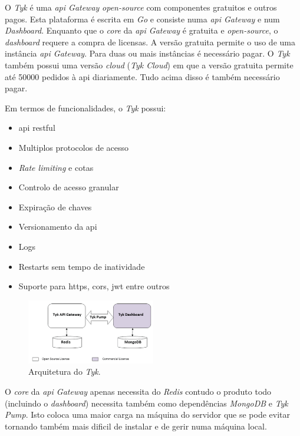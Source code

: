 O \textit{Tyk} é uma \textit{\acrshort{api} Gateway} \textit{open-source} com componentes gratuitos e outros pagos. Esta plataforma é escrita em \textit{Go} e consiste numa \textit{\acrshort{api} Gateway} e num \textit{Dashboard}. Enquanto que o \textit{core} da \textit{\acrshort{api} Gateway} é gratuita e \textit{open-source}, o \textit{dashboard} requere a compra de licensas. A versão gratuita permite o uso de uma instância \textit{\acrshort{api} Gateway}. Para duas ou mais instâncias é necessário pagar. O \textit{Tyk} também possui uma versão \textit{cloud} (\textit{Tyk Cloud}) em que a versão gratuita permite até 50000 pedidos à \acrshort{api} diariamente. Tudo acima disso é também necessário pagar.

Em termos de funcionalidades, o \textit{Tyk} possui:~\cite{tyk}
\begin{itemize}
    \item \acrshort{api} \acrshort{rest}ful
    \item Multiplos protocolos de acesso
    \item \textit{Rate limiting} e cotas
    \item Controlo de acesso granular
    \item Expiração de chaves
    \item Versionamento da \acrshort{api}
    \item Logs
    \item Restarts sem tempo de inatividade
    \item Suporte para \acrshort{https}, \acrshort{cors}, \acrshort{jwt} entre outros
\end{itemize}

\begin{figure}[H]
    \begin{center}
        \includegraphics[width=0.5\textwidth]{img/tykArch.png}
    \end{center}
    \caption{Arquitetura do \textit{Tyk}.~\cite{tyk}}
\end{figure}

O \textit{core} da \textit{\acrshort{api} Gateway} apenas necessita do \textit{Redis} contudo o produto todo (incluindo o \textit{dashboard}) necessita também como dependências \textit{MongoDB} e \textit{Tyk Pump}. Isto coloca uma maior carga na máquina do servidor que se pode evitar tornando também mais dificil de instalar e de gerir numa máquina local.

